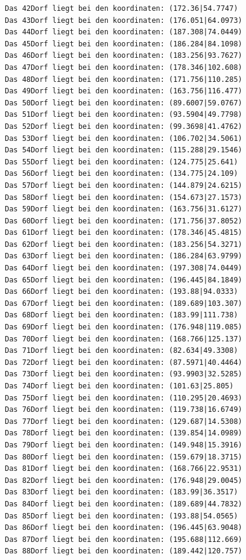 \documentclass{article}
\begin{document}
\begin{verbatim}
Das 42Dorf liegt bei den koordinaten: (172.36|54.7747)
Das 43Dorf liegt bei den koordinaten: (176.051|64.0973)
Das 44Dorf liegt bei den koordinaten: (187.308|74.0449)
Das 45Dorf liegt bei den koordinaten: (186.284|84.1098)
Das 46Dorf liegt bei den koordinaten: (183.256|93.7627)
Das 47Dorf liegt bei den koordinaten: (178.346|102.608)
Das 48Dorf liegt bei den koordinaten: (171.756|110.285)
Das 49Dorf liegt bei den koordinaten: (163.756|116.477)
Das 50Dorf liegt bei den koordinaten: (89.6007|59.0767)
Das 51Dorf liegt bei den koordinaten: (93.5904|49.7798)
Das 52Dorf liegt bei den koordinaten: (99.3698|41.4762)
Das 53Dorf liegt bei den koordinaten: (106.702|34.5061)
Das 54Dorf liegt bei den koordinaten: (115.288|29.1546)
Das 55Dorf liegt bei den koordinaten: (124.775|25.641)
Das 56Dorf liegt bei den koordinaten: (134.775|24.109)
Das 57Dorf liegt bei den koordinaten: (144.879|24.6215)
Das 58Dorf liegt bei den koordinaten: (154.673|27.1573)
Das 59Dorf liegt bei den koordinaten: (163.756|31.6127)
Das 60Dorf liegt bei den koordinaten: (171.756|37.8052)
Das 61Dorf liegt bei den koordinaten: (178.346|45.4815)
Das 62Dorf liegt bei den koordinaten: (183.256|54.3271)
Das 63Dorf liegt bei den koordinaten: (186.284|63.9799)
Das 64Dorf liegt bei den koordinaten: (197.308|74.0449)
Das 65Dorf liegt bei den koordinaten: (196.445|84.1849)
Das 66Dorf liegt bei den koordinaten: (193.88|94.0333)
Das 67Dorf liegt bei den koordinaten: (189.689|103.307)
Das 68Dorf liegt bei den koordinaten: (183.99|111.738)
Das 69Dorf liegt bei den koordinaten: (176.948|119.085)
Das 70Dorf liegt bei den koordinaten: (168.766|125.137)
Das 71Dorf liegt bei den koordinaten: (82.634|49.3308)
Das 72Dorf liegt bei den koordinaten: (87.5971|40.4464)
Das 73Dorf liegt bei den koordinaten: (93.9903|32.5285)
Das 74Dorf liegt bei den koordinaten: (101.63|25.805)
Das 75Dorf liegt bei den koordinaten: (110.295|20.4693)
Das 76Dorf liegt bei den koordinaten: (119.738|16.6749)
Das 77Dorf liegt bei den koordinaten: (129.687|14.5308)
Das 78Dorf liegt bei den koordinaten: (139.854|14.0989)
Das 79Dorf liegt bei den koordinaten: (149.948|15.3916)
Das 80Dorf liegt bei den koordinaten: (159.679|18.3715)
Das 81Dorf liegt bei den koordinaten: (168.766|22.9531)
Das 82Dorf liegt bei den koordinaten: (176.948|29.0045)
Das 83Dorf liegt bei den koordinaten: (183.99|36.3517)
Das 84Dorf liegt bei den koordinaten: (189.689|44.7832)
Das 85Dorf liegt bei den koordinaten: (193.88|54.0565)
Das 86Dorf liegt bei den koordinaten: (196.445|63.9048)
Das 87Dorf liegt bei den koordinaten: (195.688|112.669)
Das 88Dorf liegt bei den koordinaten: (189.442|120.757)

\end{verbatim}
\end{document}
